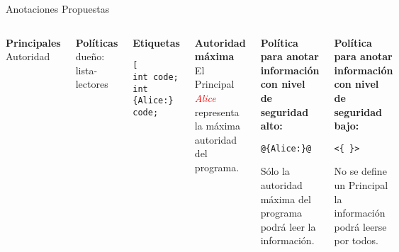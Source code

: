\begin{frame}[fragile]{Anotaciones Propuestas}
\begin{columns}[T]
\begin{mdframed}
\scriptsize{
\textbf{Principales}\newline
Autoridad
}
\end{mdframed}
\vspace{-0.5em}
\begin{mdframed}
\scriptsize{
\textbf{Políticas}\newline
{dueño: lista-lectores}
}
\end{mdframed}
\vspace{-0.5em}
\begin{mdframed}

\scriptsize{
\textbf{Etiquetas}\newline}
\begin{lstlisting}[style=base2][
int code; 
int {Alice:} code; 
\end{lstlisting}
\end{mdframed}
\vspace{-0.5em}
\column{2in}
\begin{mdframed}
\scriptsize{
\textbf{Autoridad máxima}\newline
El Principal \emph{\textcolor{red}{Alice}} representa la máxima autoridad del
programa.}
\end{mdframed}
\vspace{-0.5em}

\begin{mdframed}
\scriptsize{
\textbf{Política para anotar información con nivel de seguridad alto:}
\vspace{-0.5em}
\begin{lstlisting}[style=base2]
@{Alice:}@
\end{lstlisting}
\vspace{-0.5em}
Sólo la autoridad máxima del programa podrá leer la información. 
}
\end{mdframed}
\vspace{-0.5em}

\begin{mdframed}
\scriptsize{
\textbf{Política para anotar información con nivel de seguridad bajo:}
\vspace{-0.5em}
\begin{lstlisting}[style=base2]
<{ }>
\end{lstlisting}
\vspace{-0.5em}
No se define un Principal la información podrá leerse por todos. }
\end{mdframed}
\end{columns}
\end{frame}

